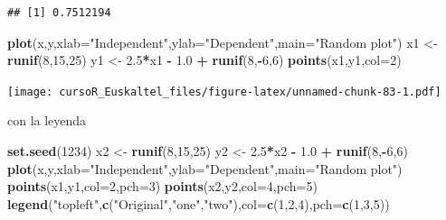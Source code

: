 \documentclass[]{book}
\newenvironment{Shaded}{\begin{snugshade}}{\end{snugshade}}
\newcommand{\KeywordTok}[1]{\textcolor[rgb]{0.13,0.29,0.53}{\textbf{#1}}}
\newcommand{\DataTypeTok}[1]{\textcolor[rgb]{0.13,0.29,0.53}{#1}}
\newcommand{\DecValTok}[1]{\textcolor[rgb]{0.00,0.00,0.81}{#1}}
\newcommand{\FloatTok}[1]{\textcolor[rgb]{0.00,0.00,0.81}{#1}}
\newcommand{\StringTok}[1]{\textcolor[rgb]{0.31,0.60,0.02}{#1}}
\newcommand{\OperatorTok}[1]{\textcolor[rgb]{0.81,0.36,0.00}{\textbf{#1}}}
\newcommand{\NormalTok}[1]{#1}
\begin{document}
\begin{verbatim}
## [1] 0.7512194
\end{verbatim}

\begin{Shaded}
\begin{Highlighting}[]
 \KeywordTok{plot}\NormalTok{(x,y,}\DataTypeTok{xlab=}\StringTok{"Independent"}\NormalTok{,}\DataTypeTok{ylab=}\StringTok{"Dependent"}\NormalTok{,}\DataTypeTok{main=}\StringTok{"Random plot"}\NormalTok{)}
\NormalTok{ x1 <-}\StringTok{ }\KeywordTok{runif}\NormalTok{(}\DecValTok{8}\NormalTok{,}\DecValTok{15}\NormalTok{,}\DecValTok{25}\NormalTok{)}
\NormalTok{ y1 <-}\StringTok{ }\FloatTok{2.5}\OperatorTok{*}\NormalTok{x1 }\OperatorTok{-}\StringTok{ }\FloatTok{1.0} \OperatorTok{+}\StringTok{ }\KeywordTok{runif}\NormalTok{(}\DecValTok{8}\NormalTok{,}\OperatorTok{-}\DecValTok{6}\NormalTok{,}\DecValTok{6}\NormalTok{)}
 \KeywordTok{points}\NormalTok{(x1,y1,}\DataTypeTok{col=}\DecValTok{2}\NormalTok{)}
\end{Highlighting}
\end{Shaded}

\texttt{[image: cursoR\_Euskaltel\_files/figure-latex/unnamed-chunk-83-1.pdf]}

con la leyenda

\begin{Shaded}
\begin{Highlighting}[]
\KeywordTok{set.seed}\NormalTok{(}\DecValTok{1234}\NormalTok{)}
\NormalTok{x2 <-}\StringTok{ }\KeywordTok{runif}\NormalTok{(}\DecValTok{8}\NormalTok{,}\DecValTok{15}\NormalTok{,}\DecValTok{25}\NormalTok{)}
\NormalTok{y2 <-}\StringTok{ }\FloatTok{2.5}\OperatorTok{*}\NormalTok{x2 }\OperatorTok{-}\StringTok{ }\FloatTok{1.0} \OperatorTok{+}\StringTok{ }\KeywordTok{runif}\NormalTok{(}\DecValTok{8}\NormalTok{,}\OperatorTok{-}\DecValTok{6}\NormalTok{,}\DecValTok{6}\NormalTok{)}
 \KeywordTok{plot}\NormalTok{(x,y,}\DataTypeTok{xlab=}\StringTok{"Independent"}\NormalTok{,}\DataTypeTok{ylab=}\StringTok{"Dependent"}\NormalTok{,}\DataTypeTok{main=}\StringTok{"Random plot"}\NormalTok{)}
 \KeywordTok{points}\NormalTok{(x1,y1,}\DataTypeTok{col=}\DecValTok{2}\NormalTok{,}\DataTypeTok{pch=}\DecValTok{3}\NormalTok{)}
 \KeywordTok{points}\NormalTok{(x2,y2,}\DataTypeTok{col=}\DecValTok{4}\NormalTok{,}\DataTypeTok{pch=}\DecValTok{5}\NormalTok{)}
 \KeywordTok{legend}\NormalTok{(}\StringTok{"topleft"}\NormalTok{,}\KeywordTok{c}\NormalTok{(}\StringTok{"Original"}\NormalTok{,}\StringTok{"one"}\NormalTok{,}\StringTok{"two"}\NormalTok{),}\DataTypeTok{col=}\KeywordTok{c}\NormalTok{(}\DecValTok{1}\NormalTok{,}\DecValTok{2}\NormalTok{,}\DecValTok{4}\NormalTok{),}\DataTypeTok{pch=}\KeywordTok{c}\NormalTok{(}\DecValTok{1}\NormalTok{,}\DecValTok{3}\NormalTok{,}\DecValTok{5}\NormalTok{))}
\end{Highlighting}
\end{Shaded}
\end{document}
